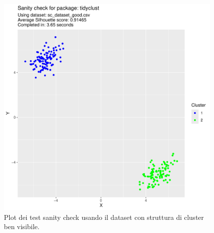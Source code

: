 \documentclass[12pt]{report}
\begin{document}
\begin{figure}[h]
\begin{boxedminipage}{0.5\textwidth}
				\end{boxedminipage}
				\begin{boxedminipage}{0.5\textwidth}
					\includegraphics[width = \textwidth, page = 1]{results/results_TIDYCLUST.pdf}
				\end{boxedminipage}
				\begin{boxedminipage}{0.5\textwidth}
				\end{boxedminipage}
				\caption{Plot dei test sanity check usando il dataset con struttura di cluster
				ben visibile.}
				\label{fig:good}
			\end{figure}
\end{document}
